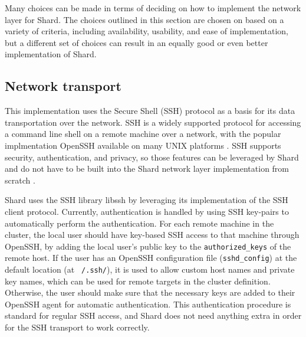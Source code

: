 \documentclass[twoside]{report}
\begin{document}

Many choices can be made in terms of deciding on how to implement the network layer for Shard.
The choices outlined in this section are chosen on based on a variety of criteria, including availability, usability, and ease of implementation, but a different set of choices can result in an equally good or even better implementation of Shard.

\subsection{Network transport}
This implementation uses the Secure Shell (SSH) protocol as a basis for its data transportation over the network.
SSH is a widely supported protocol for accessing a command line shell on a remote machine over a network, with the popular implmentation OpenSSH available on many UNIX platforms \cite{openssh}.
SSH supports security, authentication, and privacy, so those features can be leveraged by Shard and do not have to be built into the Shard network layer implementation from scratch \cite{rfc4251}.

Shard uses the SSH library libssh by leveraging its implementation of the SSH client protocol.
Currently, authentication is handled by using SSH key-pairs to automatically perform the authentication.
For each remote machine in the cluster, the local user should have key-based SSH access to that machine through OpenSSH, by adding the local user's public key to the \texttt{authorized\_keys} of the remote host.
If the user has an OpenSSH configuration file (\texttt{sshd\_config}) at the default location (at \texttt{~/.ssh/}), it is used to allow custom host names and private key names, which can be used for remote targets in the cluster definition.
Otherwise, the user should make sure that the necessary keys are added to their OpenSSH agent for automatic authentication.
This authentication procedure is standard for regular SSH access, and Shard does not need anything extra in order for the SSH transport to work correctly.
\end{document}
